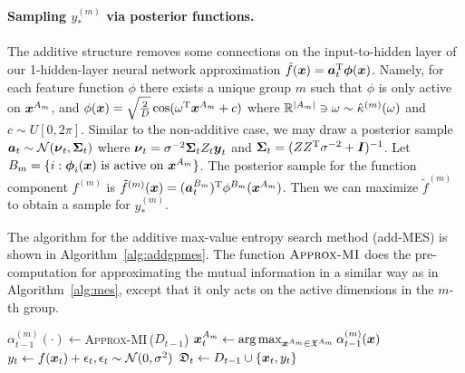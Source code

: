 \paragraph{Sampling $y^{(m)}_*$ via posterior functions.} The additive structure removes some connections on the input-to-hidden layer of our 1-hidden-layer neural network approximation $\tilde f({\boldsymbol{x}})=\boldsymbol{a}_t^{\textrm T}\boldsymbol{\phi}({\boldsymbol{x}})$.  Namely, for each feature function $\phi$ there exists a unique group $m$ such that $\phi$ is only active on ${\boldsymbol{x}}^{A_m}$, %
 and $\phi({\boldsymbol{x}}) =  \sqrt{\frac2D} \cos(\omega^{\textrm T} {\boldsymbol{x}}^{A_m} + c)$ where $\mathbb{R}^{|A_m|}\ni\omega\sim \hat {\kappa}^{(m)}(\omega)$ and $c \sim U[0,2\pi]$. Similar to the non-additive case, we may draw a posterior sample $\boldsymbol{a}_t\sim\mathcal N({\boldsymbol{\nu}}_t,\boldsymbol{\Sigma}_t)$ where ${\boldsymbol{\nu}}_t = \sigma^{-2}\boldsymbol{\Sigma}_t Z_t\boldsymbol{y}_t $ and $\boldsymbol{\Sigma}_t = (Z Z^{\textrm T} \sigma^{-2} +\boldsymbol{I})^{-1}$. Let $B_m = \{i: \boldsymbol{\phi}_i({\boldsymbol{x}}) \text{ is active on ${\boldsymbol{x}}^{A_m}$}\}$. The posterior sample for the function component $f^{(m)}$ is $\tilde f^{(m)}({\boldsymbol{x}})=(\boldsymbol{a}^{B_m}_t)^{\textrm T}\phi^{B_m}({\boldsymbol{x}}^{A_m})$. Then we can maximize $\tilde f^{(m)}$ to obtain a sample for $y^{(m)}_*$.
%

The algorithm for the additive max-value entropy search method (add-MES) is shown in Algorithm~\ref{alg:addgpmes}. The function $\textsc{Approx-MI}$ does the pre-computation for approximating the mutual information in a similar way as in Algorithm~\ref{alg:mes}, except that it only acts on the active dimensions in the $m$-th group. %

\begin{algorithm} %
  \caption{Additive Max-value Entropy Search}\label{alg:addgpmes}
  \begin{algorithmic}[1]
      \STATE $\alpha^{(m)}_{t-1}(\cdot)\gets$\textsc{Approx-MI\,}($D_{t-1}$)
      \STATE ${\boldsymbol{x}}^{A_m}_t\gets \operatorname{arg\,max}_{{\boldsymbol{x}}^{A_m}\in\mathfrak X^{A_m}}{\alpha_{t-1}^{(m)}({\boldsymbol{x}})}$ 
      \ENDFOR
      \STATE $y_t\gets f({\boldsymbol{x}}_t) + \epsilon_t, \epsilon_t\sim\mathcal N(0,\sigma^2)$
      \STATE $\mathfrak D_t \gets D_{t-1}\cup \{{\boldsymbol{x}}_t,y_t\}$
      \ENDFOR
      \ENDFUNCTION
  \end{algorithmic}
\end{algorithm}

